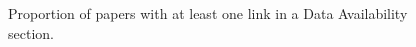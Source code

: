 \documentclass{article}
\begin{document}
\begin{figure}[htbp]
\begin{subfigure}[b]{0.45\textwidth}
        \label{fig:artifact-location-evolution-FSE}
    \end{subfigure}
\caption{Proportion of papers with at least one link in a Data Availability section.}
    \label{fig:artifact-location-evolution-ICSE-FSE}
\end{figure}
\end{document}

